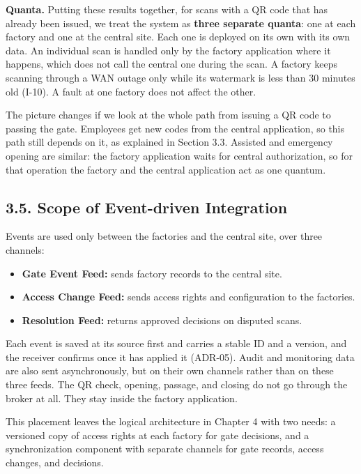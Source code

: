 \textbf{Quanta.} Putting these results together, for scans with a QR code that has already been issued, we treat the system as \textbf{three separate quanta}: one at each factory and one at the central site. Each one is deployed on its own with its own data. An individual scan is handled only by the factory application where it happens, which does not call the central one during the scan. A factory keeps scanning through a WAN outage only while its watermark is less than 30 minutes old (I-10). A fault at one factory does not affect the other.

The picture changes if we look at the whole path from issuing a QR code to passing the gate. Employees get new codes from the central application, so this path still depends on it, as explained in Section 3.3. Assisted and emergency opening are similar: the factory application waits for central authorization, so for that operation the factory and the central application act as one quantum.

\subsection*{3.5. Scope of Event-driven Integration}

{}


Events are used only between the factories and the central site, over three channels:

\begin{itemize}[leftmargin=36pt, itemsep=2pt, topsep=4pt, parsep=2pt]
  \item \textbf{Gate Event Feed:} sends factory records to the central site.
  \item \textbf{Access Change Feed:} sends access rights and configuration to the factories.
  \item \textbf{Resolution Feed:} returns approved decisions on disputed scans.
\end{itemize}

Each event is saved at its source first and carries a stable ID and a version, and the receiver confirms once it has applied it (ADR-05). Audit and monitoring data are also sent asynchronously, but on their own channels rather than on these three feeds. The QR check, opening, passage, and closing do not go through the broker at all. They stay inside the factory application.

This placement leaves the logical architecture in Chapter 4 with two needs: a versioned copy of access rights at each factory for gate decisions, and a synchronization component with separate channels for gate records, access changes, and decisions.

\endgroup
